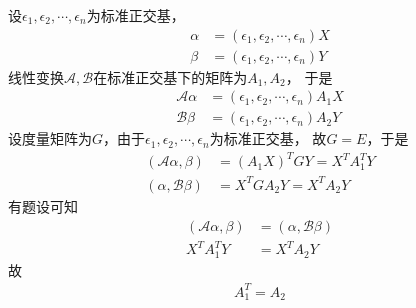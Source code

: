 \documentclass{article}
\begin{document}
设$\epsilon_1, \epsilon_2, \cdots, \epsilon_n$为标准正交基，
\begin{align*}
  \alpha & = (\epsilon_1, \epsilon_2, \cdots, \epsilon_n) X \\
  \beta  & = (\epsilon_1, \epsilon_2, \cdots, \epsilon_n) Y
\end{align*}
线性变换$\mathscr{A}, \mathscr{B}$在标准正交基下的矩阵为$A_1, A_2$，
于是
\begin{align*}
  \mathscr{A} \alpha & = (\epsilon_1, \epsilon_2, \cdots, \epsilon_n) A_1 X \\
  \mathscr{B} \beta  & = (\epsilon_1, \epsilon_2, \cdots, \epsilon_n) A_2 Y
\end{align*}
设度量矩阵为$G$，由于$\epsilon_1, \epsilon_2, \cdots, \epsilon_n$为标准正交基，
故$G = E$，于是
\begin{align*}
  (\mathscr{A} \alpha, \beta) & = (A_1 X)^T G Y = X^T A_1^T Y \\
  (\alpha, \mathscr{B} \beta) & = X^T G A_2 Y =  X^T A_2 Y
\end{align*}
有题设可知
\begin{align*}
  (\mathscr{A} \alpha, \beta) & = (\alpha, \mathscr{B} \beta) \\
  X^T A_1^T Y                 & = X^T A_2 Y
\end{align*}
故
\begin{align*}
  A_1^T = A_2
\end{align*}
\end{document}
